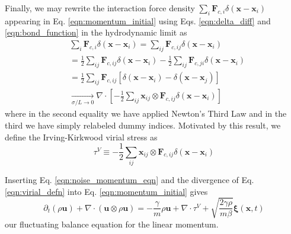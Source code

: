 \documentclass[%
 reprint,
superscriptaddress,
longbibliography,
 amsmath,amssymb,
 prl,
 citeautoscript,
]{revtex4-1}
\begin{document}
Finally, we may rewrite the interaction force density $\sum_i {\boldsymbol F}_{c,i} \delta \left( {\boldsymbol x} - {\boldsymbol x}_i \right)$ appearing in Eq. \ref{eqn:momentum_initial} using Eqs. \ref{eqn:delta_diff} and \ref{eqn:bond_function} in the hydrodynamic limit as \cite{Irving+Kirkwood}
\[
\begin{split}
&\sum_i {\boldsymbol F}_{c,i} \delta \left( {\boldsymbol x} - {\boldsymbol x}_i \right) = \sum_{ij} {\boldsymbol F}_{c,ij} \delta \left( {\boldsymbol x} - {\boldsymbol x}_i \right) \\
&= \frac{1}{2} \sum_{ij} {\boldsymbol F}_{c,ij} \delta \left( {\boldsymbol x} - {\boldsymbol x}_i \right) - \frac{1}{2} \sum_{ij} {\boldsymbol F}_{c,ji} \delta \left( {\boldsymbol x} - {\boldsymbol x}_i \right) \\
&= \frac{1}{2} \sum_{ij} {\boldsymbol F}_{c,ij} \left[ \delta \left( {\boldsymbol x} - {\boldsymbol x}_i \right) - \delta \left( {\boldsymbol x} - {\boldsymbol x}_j \right) \right] \\
&\xrightarrow[\sigma/L \rightarrow 0]{} \nabla \cdot \left[ - \frac{1}{2} \sum_{ij} {\boldsymbol x}_{ij} \otimes {\boldsymbol F}_{c,ij} \delta \left( {\boldsymbol x} - {\boldsymbol x}_i \right) \right]
\end{split}
\]
where in the second equality we have applied Newton's Third Law and in the third we have simply relabeled dummy indices. Motivated by this result, we define the Irving-Kirkwood virial stress as
\begin{equation}
\tau^V \equiv - \frac{1}{2} \sum_{ij} {\boldsymbol x}_{ij} \otimes {\boldsymbol F}_{c,ij} \delta \left( {\boldsymbol x} - {\boldsymbol x}_i \right)
\label{eqn:virial_defn}
\end{equation}

Inserting Eq. \ref{eqn:noise_momentum_eqn} and the divergence of Eq. \ref{eqn:virial_defn} into Eq. \ref{eqn:momentum_initial} gives
\begin{equation}
\partial_t \left( \rho {\boldsymbol u} \right) + \nabla \cdot \left( {\boldsymbol u} \otimes \rho {\boldsymbol u} \right) = - \frac{\gamma}{m} \rho {\boldsymbol u} + \nabla \cdot \tau^V + \sqrt{\frac{2 \gamma \rho}{m \beta}} {\boldsymbol \xi} \left( {\boldsymbol x}, t \right)
\label{eqn:momentum_fluctuating}
\end{equation}
our fluctuating balance equation for the linear momentum.
\end{document}

